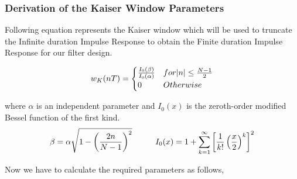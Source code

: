 \documentclass[a4paper,11pt]{article}%
\begin{document}
\subsubsection{Derivation of the Kaiser Window Parameters}

Following equation represents the Kaiser window which will be used to truncate the Infinite duration Impulse Response to obtain the Finite duration Impulse Response for our filter design.

\begin{equation}
w_K(nT) = \begin{cases}
	\frac{I_0(\beta)}{I_0(\alpha)} & for \abs{n}  \leq \frac{N-1}{2} \\
	0 & Otherwise
	\label{kaiser}
\end{cases}	
\end{equation}


where $\alpha$ is an independent parameter and $I_0(x)$ is the zeroth-order modified Bessel function of the first kind.\\
\[ 
\beta = \alpha\sqrt{1-\left(\frac{2n}{N-1}\right)^2} \hspace*{1cm} I_0(x) = 1+\sum_{k=1}^{\infty}\left[\frac{1}{k!}\left(\frac{x}{2}\right)^k\right]^2
 \]

Now we have to calculate the required parameters as follows,
\end{document}
